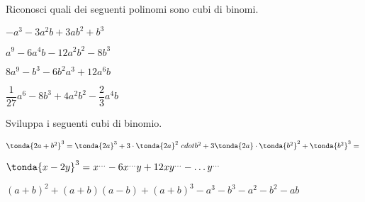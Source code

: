 \subsubsection*{}

\begin{esercizio}
\label{ese:11.24}
Riconosci quali dei seguenti polinomi sono cubi di binomi.
\TabPositions{5cm}
\begin{enumeratea}
\item \(-a^{3}-3a^{2}b+3{ab}^{2}+b^{3}\) \hfill\sino
\item \(a^{9}-6a^{4}b-12a^{2}b^{2}-8b^{3}\) \hfill\sino
\item \(8a^{9}-b^{3}-6b^{2}a^{3}+12a^{6}b\) \hfill\sino
\item \(\dfrac{1}{27}a^{6}-8b^{3}+4a^{2}b^{2}-\dfrac{2}{3}a^{4}b\) 
\hfill\sino
\end{enumeratea}
\end{esercizio}

\begin{esercizio}
\label{ese:11.25}
Sviluppa i seguenti cubi di binomio.

\begin{enumeratea}
\item \( 
\tonda{2a+b^{2}}^{3}=\tonda{2a}^{3}+3\cdot\tonda{2a}^{2}\
cdot 
b^{2}+3\tonda{2a}\cdot\tonda{b^{2}}^{2}+\tonda{b^{2}}^{3}
=\dotfill~\)
\item \(\tonda{x-2y}^{3}=x^{\ldots }-6x^{\ldots 
}y+12{xy}^{\ldots}-\ldots 
y^{\ldots }\)
\item \((a+b)^{2}+(a+b)(a-b)+(a+b)^{3}-a^{3}-b^{3}-a^{2}-b^{2}-{ab}\)
\end{enumeratea}
\end{esercizio}

